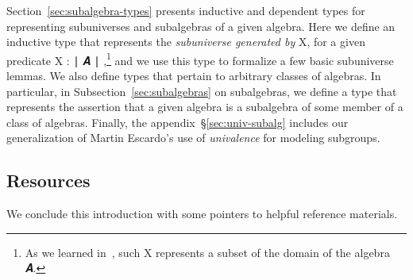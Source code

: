 Section~\ref{sec:subalgebra-types} presents inductive and dependent types for representing subuniverses and subalgebras of a given algebra. Here we define an inductive type that represents the \emph{subuniverse generated by} \ab X, for a given predicate \ab X \as :  \af ∣ \ab 𝑨 \af ∣ \AgdaUnderscore,\footnote{As we learned in~\cite{DeMeo:2021-1}, such \ab X represents a subset of the domain of the algebra \ab 𝑨.} and we use this type to formalize a few basic subuniverse lemmas.  We also define types that pertain to arbitrary classes of algebras. In particular, in Subsection~\ref{sec:subalgebras} on subalgebras, we define a type that represents the assertion that a given algebra is a subalgebra of some member of a class of algebras.  Finally, the appendix~\S\ref{sec:univ-subalg} includes our generalization of Martin Escardo's use of \emph{univalence} for modeling subgroups.

\newcommand\otherparta{\textit{Part 1: equality, extensionality, truncation, and dependent types for relations and algebras}~\cite{DeMeo:2021-1}.}
\newcommand\otherpartb{\textit{Part 3: free algebras, equational classes, and Birkhoff's theorem}~\cite{DeMeo:2021-3}.}

\subsection{Resources}
We conclude this introduction with some pointers to helpful reference materials.

